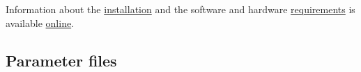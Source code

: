 Information about the \href{https://github.com/bHimes/emClarity/wiki/Installation}{installation} and the software and hardware \href{https://github.com/bHimes/emClarity/wiki/Requirements}{requirements} is available \href{https://github.com/bHimes/emClarity/wiki}{online}.


    



\subsection{Parameter files}

